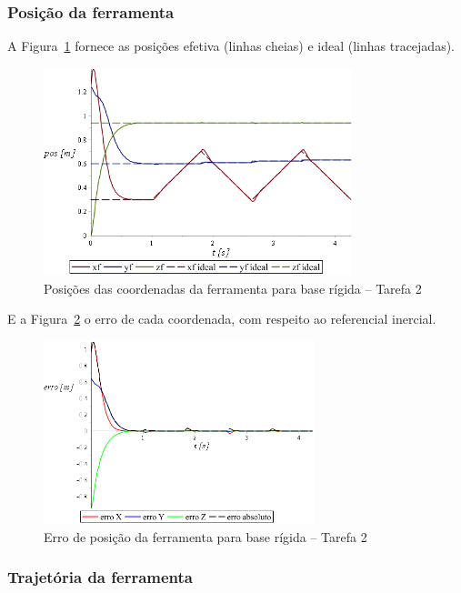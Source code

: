 \subsubsection{Posição da ferramenta}

A Figura~\ref{fig::t2_posf_base_rig} fornece as posições efetiva (linhas cheias)
e ideal (linhas tracejadas). 

\begin{figure}[h!]
	\centering 
 	\includegraphics[width=0.80\textwidth]{figs/t2_posf_base_rig}
 	\caption{Posições das coordenadas da ferramenta para base rígida -- Tarefa 2}
 	\label{fig::t2_posf_base_rig}
\end{figure}

E a Figura~\ref{fig::t2_erroposf_base_rig} o erro
de cada coordenada, com respeito ao referencial inercial.

\begin{figure}[h]
	\centering 
 	\includegraphics[width=0.70\textwidth]{figs/t2_erroposf_base_rig}
 	\caption{Erro de posição da ferramenta para base rígida -- Tarefa 2}
 	\label{fig::t2_erroposf_base_rig}
\end{figure}


\subsubsection{Trajetória da ferramenta}

